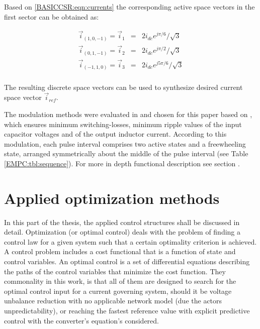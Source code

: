 		Based on \ref{BASICCSR:eqn:currents} the corresponding active space vectors in the first sector can be obtained as:
		
		\begin{equation}
        \begin{array}{rcl}
            \vec{i}_{(1,0,-1)}=\vec{i}_1&=&2i_{dc}e^{j\pi/6}/\sqrt{3}\\
						\vec{i}_{(0,1,-1)}=\vec{i}_2&=&2i_{dc}e^{j\pi/2}/\sqrt{3}\\
						\vec{i}_{(-1,1,0)}=\vec{i}_3&=&2i_{dc}e^{j5\pi/6}/\sqrt{3}\\
        \end{array}
        \label{BASICCSR:eqn:currents}
    \end{equation}
		
		The resulting discrete space vectors can be used to synthesize desired current
space vector $\vec{i}_{ref}$.

The modulation methods were evaluated in and chosen for this paper based on \cite{moussaoui2005open}, which ensures minimum switching-losses, minimum ripple values of the input capacitor voltages and of the output inductor current. According to this modulation, each pulse interval comprises two active states and a freewheeling state, arranged symmetrically about the middle of the pulse interval (see Table \ref{EMPC:tbl:sequence}). For more in depth functional description see section \cite{EMPC:sec:Modulation}.

\section{Applied optimization methods}

In this part of the thesis, the applied control structures shall be discussed in detail. Optimization (or optimal control) deals with the problem of finding a control law for a given system such that a certain optimality criterion is achieved. A control problem includes a cost functional that is a function of state and control variables. An optimal control is a set of differential equations describing the paths of the control variables that minimize the cost function. They commonality in this work, is that all of them are designed to search for the optimal control input for a current governing system, should it be voltage unbalance reduction with no applicable network model (due the actors unpredictability), or reaching the fastest reference value with explicit predictive control with the converter's equation's considered.

